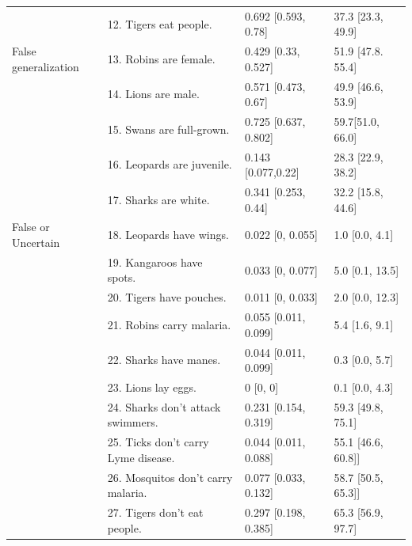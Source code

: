 \documentclass[12pt,letterpaper]{article}
\begin{document}
\begin{table}[h]
\begin{tabular}{| l | l | p{3.5cm} | p{3.5cm} |}
                                  & 12. Tigers eat people.                        &0.692	[0.593, 0.78] & 37.3 [23.3, 49.9]\\
False generalization & 13. Robins are female.      &0.429	[0.33, 0.527] & 51.9 [47.8. 55.4]\\
                                              & 14.  Lions are male.                       &0.571	[0.473, 0.67] & 49.9 [46.6, 53.9]\\
                                         & 15. Swans are full-grown. & 0.725	[0.637, 0.802] & 59.7[51.0, 66.0]\\
                                         & 16. Leopards are juvenile. & 0.143	[0.077,0.22] & 28.3 [22.9, 38.2] \\
                                         & 17. Sharks are white. & 0.341	[0.253, 0.44] & 32.2 [15.8, 44.6] \\
False or Uncertain & 18. Leopards have wings.       &0.022	[0, 0.055]& 1.0 [0.0, 4.1]\\
                                              & 19. Kangaroos have spots.                       & 0.033 [0, 0.077]& 5.0 [0.1, 13.5]\\
                                              & 20.  Tigers have pouches.                       &0.011	[0, 0.033]& 2.0 [0.0, 12.3]\\
                                              & 21.  Robins carry malaria.                       &0.055	[0.011, 0.099]& 5.4 [1.6, 9.1]\\
                                              & 22. Sharks have manes.                       &0.044	[0.011, 0.099]& 0.3 [0.0, 5.7]\\
                                              & 23. Lions lay eggs.                       &0 [0, 0] & 0.1 [0.0, 4.3]\\
                                              & 24. Sharks don't attack swimmers.                       &0.231 [0.154, 0.319] & 59.3 [49.8, 75.1]\\
                                              & 25. Ticks don't carry Lyme disease.                       &0.044 [0.011, 0.088] & 55.1 [46.6, 60.8]]\\
                                              & 26. Mosquitos don't carry malaria.                       &0.077 [0.033, 0.132] & 58.7 [50.5, 65.3]]\\                                              
                                              & 27. Tigers don't eat people.                       &0.297 [0.198, 0.385]& 65.3 [56.9, 97.7]\\                                              

\end{tabular}
\end{table}
\end{document}
